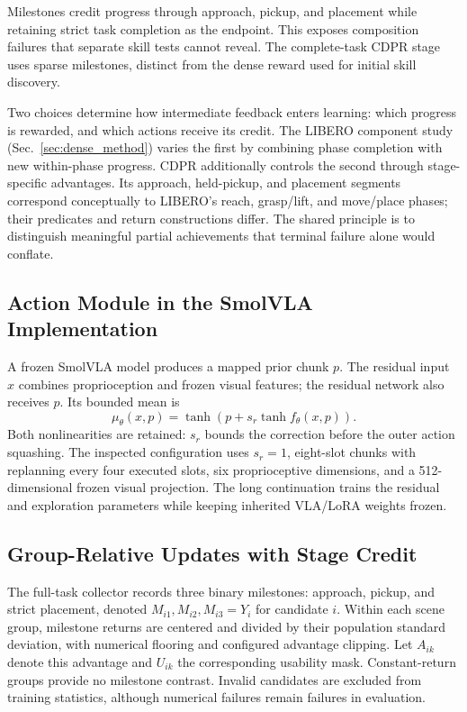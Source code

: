 Milestones credit progress through approach, pickup, and placement while retaining strict task completion as the endpoint. This exposes composition failures that separate skill tests cannot reveal. The complete-task CDPR stage uses sparse milestones, distinct from the dense reward used for initial skill discovery.

Two choices determine how intermediate feedback enters learning: which progress is rewarded, and which actions receive its credit. The LIBERO component study (Sec.~\ref{sec:dense_method}) varies the first by combining phase completion with new within-phase progress. CDPR additionally controls the second through stage-specific advantages. Its approach, held-pickup, and placement segments correspond conceptually to LIBERO's reach, grasp/lift, and move/place phases; their predicates and return constructions differ. The shared principle is to distinguish meaningful partial achievements that terminal failure alone would conflate.

\subsection{Action Module in the SmolVLA Implementation}
A frozen SmolVLA model produces a mapped prior chunk $p$. The residual input $x$ combines proprioception and frozen visual features; the residual network also receives $p$. Its bounded mean is
\begin{equation}
\mu_\theta(x,p)=\tanh\!\left(p+s_r\tanh f_\theta(x,p)\right).
\label{eq:actor}
\end{equation}
Both nonlinearities are retained: $s_r$ bounds the correction before the outer action squashing. The inspected configuration uses $s_r=1$, eight-slot chunks with replanning every four executed slots, six proprioceptive dimensions, and a 512-dimensional frozen visual projection. The long continuation trains the residual and exploration parameters while keeping inherited VLA/LoRA weights frozen. 

\subsection{Group-Relative Updates with Stage Credit}
The full-task collector records three binary milestones: approach, pickup, and strict placement, denoted $M_{i1},M_{i2},M_{i3}=Y_i$ for candidate $i$. Within each scene group, milestone returns are centered and divided by their population standard deviation, with numerical flooring and configured advantage clipping. Let $A_{ik}$ denote this advantage and $U_{ik}$ the corresponding usability mask. Constant-return groups provide no milestone contrast. Invalid candidates are excluded from training statistics, although numerical failures remain failures in evaluation.


